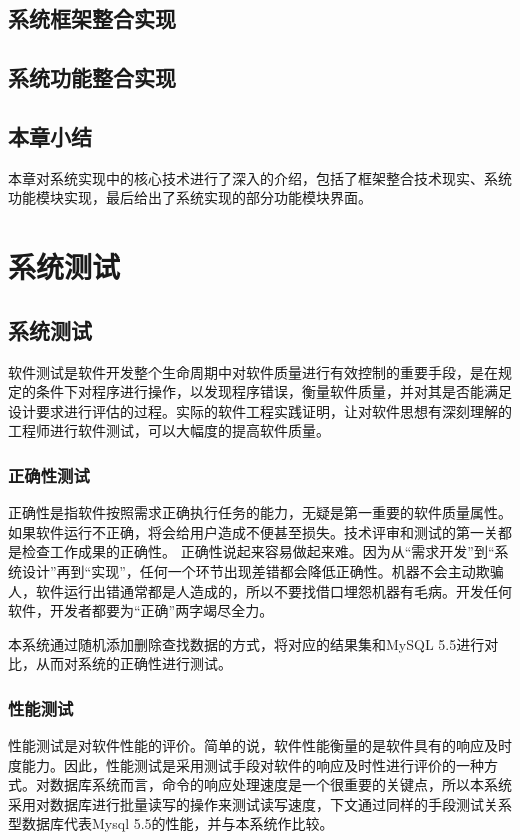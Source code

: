 \documentclass{zjutthesis}
\begin{document}
\section{系统框架整合实现}

\section{系统功能整合实现}

\section{本章小结}
本章对系统实现中的核心技术进行了深入的介绍，包括了框架整合技术现实、系统功能模块实现，最后给出了系统实现的部分功能模块界面。


\chapter{系统测试}
\section{系统测试}
软件测试是软件开发整个生命周期中对软件质量进行有效控制的重要手段，是在规定的条件下对程序进行操作，以发现程序错误，衡量软件质量，并对其是否能满足设计要求进行评估的过程。实际的软件工程实践证明，让对软件思想有深刻理解的工程师进行软件测试，可以大幅度的提高软件质量。

\subsection{正确性测试}
正确性是指软件按照需求正确执行任务的能力，无疑是第一重要的软件质量属性。如果软件运行不正确，将会给用户造成不便甚至损失。技术评审和测试的第一关都是检查工作成果的正确性。
正确性说起来容易做起来难。因为从“需求开发”到“系统设计”再到“实现”，任何一个环节出现差错都会降低正确性。机器不会主动欺骗人，软件运行出错通常都是人造成的，所以不要找借口埋怨机器有毛病。开发任何软件，开发者都要为“正确”两字竭尽全力。

本系统通过随机添加删除查找数据的方式，将对应的结果集和MySQL 5.5进行对比，从而对系统的正确性进行测试。

\subsection{性能测试}
性能测试是对软件性能的评价。简单的说，软件性能衡量的是软件具有的响应及时度能力。因此，性能测试是采用测试手段对软件的响应及时性进行评价的一种方式。对数据库系统而言，命令的响应处理速度是一个很重要的关键点，所以本系统采用对数据库进行批量读写的操作来测试读写速度，下文通过同样的手段测试关系型数据库代表Mysql 5.5的性能，并与本系统作比较。
\end{document}
